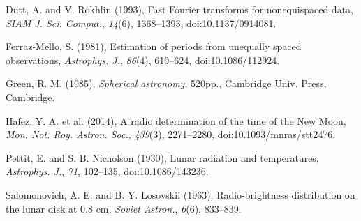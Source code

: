 \documentclass[10pt]{article}
\begin{document}
\hangindent 0.25in Dutt, A. and V. Rokhlin (1993), Fast Fourier transforms for
nonequispaced data, \textit{SIAM J. Sci. Comput.}, \textit{14}(6),
1368--1393, doi:10.1137/0914081.

\hangindent 0.25in Ferraz-Mello, S. (1981), Estimation of periods from
unequally spaced observations, \textit{Astrophys. J.}, \textit{86}(4),
619--624, doi:10.1086/112924.

\hangindent 0.25in Green, R. M. (1985), \textit{Spherical astronomy}, 520pp.,
Cambridge Univ. Press, Cambridge.

\hangindent 0.25in Hafez, Y. A. et al. (2014), A radio determination of the time of the New Moon, \textit{Mon. Not. Roy. Astron. Soc.}, \textit{439}(3), 2271--2280, doi:10.1093/mnras/stt2476.

\hangindent 0.25in Pettit, E. and S. B. Nicholson (1930), Lunar radiation and temperatures, \textit{Astrophys. J.}, \textit{71}, 102--135, doi:10.1086/143236.

\hangindent 0.25in Salomonovich, A. E. and B. Y. Losovskii (1963), Radio-brightness distribution on the lunar disk at 0.8 cm, \textit{Soviet Astron.}, \textit{6}(6), 833--839.
\end{document}
